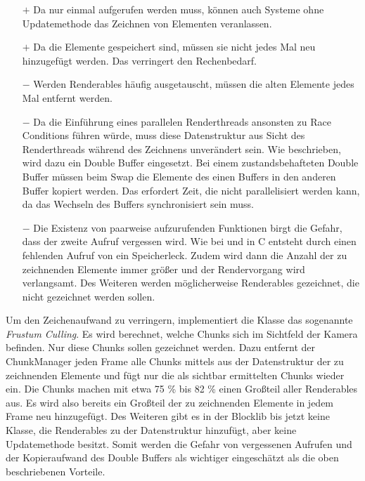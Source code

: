 \begin{itemize}
	\item[$+$] Da  nur einmal aufgerufen werden muss, können auch Systeme ohne Updatemethode das Zeichnen von Elementen veranlassen.
	\item[$+$] Da die Elemente gespeichert sind, müssen sie nicht jedes Mal neu hinzugefügt werden. Das verringert den Rechenbedarf.
	\item[$-$] Werden Renderables häufig ausgetauscht, müssen die alten Elemente jedes Mal entfernt werden.
	\item[$-$] Da die Einführung eines parallelen Renderthreads ansonsten zu Race Conditions führen würde, muss diese Datenstruktur aus Sicht des Renderthreads während des Zeichnens unverändert sein. Wie beschrieben, wird dazu ein Double Buffer eingesetzt. Bei einem zustandsbehafteten Double Buffer müssen beim Swap die Elemente des einen Buffers in den anderen Buffer kopiert werden. Das erfordert Zeit, die nicht parallelisiert werden kann, da das Wechseln des Buffers synchronisiert sein muss.
	\item[$-$] Die Existenz von paarweise aufzurufenden Funktionen birgt die Gefahr, dass der zweite Aufruf vergessen wird. Wie bei  und  in C entsteht durch einen fehlenden Aufruf von  ein Speicherleck. Zudem wird dann die Anzahl der zu zeichnenden Elemente immer größer und der Rendervorgang wird verlangsamt. Des Weiteren werden möglicherweise Renderables gezeichnet, die nicht gezeichnet werden sollen.
\end{itemize}

Um den Zeichenaufwand zu verringern, implementiert die Klasse  das sogenannte \emph{Frustum Culling}. Es wird berechnet, welche Chunks sich im Sichtfeld der Kamera befinden. Nur diese Chunks sollen gezeichnet werden. Dazu entfernt der ChunkManager jeden Frame alle Chunks mittels  aus der Datenstruktur der zu zeichnenden Elemente und fügt nur die als sichtbar ermittelten Chunks wieder ein. Die Chunks machen mit etwa 
75 \% bis
82 \% einen Großteil aller Renderables aus. Es wird also bereits ein Großteil der zu zeichnenden Elemente in jedem Frame neu hinzugefügt. Des Weiteren gibt es in der Blocklib bis jetzt keine Klasse, die Renderables zu der Datenstruktur hinzufügt, aber keine Updatemethode besitzt. Somit werden die Gefahr von vergessenen  Aufrufen und der Kopieraufwand des Double Buffers als wichtiger eingeschätzt als die oben beschriebenen Vorteile.

